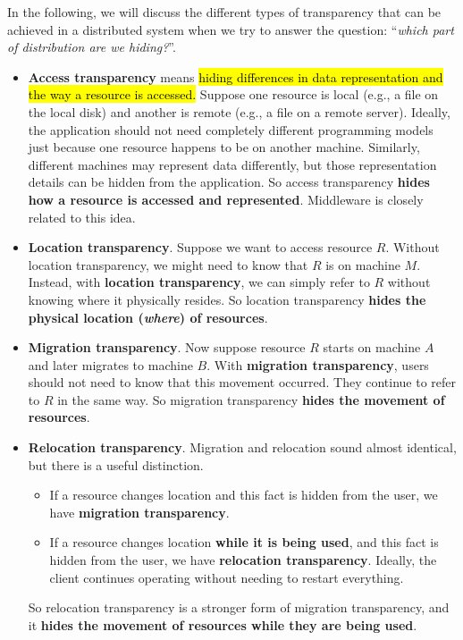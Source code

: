 \noindent
In the following, we will discuss the different types of transparency that can be achieved in a distributed system when we try to answer the question: ``\emph{which part of distribution are we hiding?}''.
\begin{itemize}\label{item:location-transparency}
    \item[\textcolor{Green3}{\faIcon{plug}}] \textcolor{Green3}{\textbf{Access transparency}} means \hl{hiding differences in data representation and the way a resource is accessed.} Suppose one resource is local (e.g., a file on the local disk) and another is remote (e.g., a file on a remote server). Ideally, the application should not need completely different programming models just because one resource happens to be on another machine. Similarly, different machines may represent data differently, but those representation details can be hidden from the application. So access transparency \textbf{hides how a resource is accessed and represented}. Middleware is closely related to this idea.

    \item[\textcolor{Green3}{\faIcon{map-marker-alt}}] \textcolor{Green3}{\textbf{Location transparency}}. Suppose we want to access resource $R$. Without location transparency, we might need to know that $R$ is on machine $M$. Instead, with \textbf{location transparency}, we can simply refer to $R$ without knowing where it physically resides. So location transparency \textbf{hides the physical location (\emph{where}) of resources}.

    \item[\textcolor{Green3}{\faIcon{exchange-alt}}] \textcolor{Green3}{\textbf{Migration transparency}}. Now suppose resource $R$ starts on machine $A$ and later migrates to machine $B$. With \textbf{migration transparency}, users should not need to know that this movement occurred. They continue to refer to $R$ in the same way. So migration transparency \textbf{hides the movement of resources}.

    \item[\textcolor{Green3}{\faIcon{route}}] \textcolor{Green3}{\textbf{Relocation transparency}}. Migration and relocation sound almost identical, but there is a useful distinction.
        \begin{itemize}
            \item If a resource changes location and this fact is hidden from the user, we have \textbf{migration transparency}.
            \item If a resource changes location \textbf{while it is being used}, and this fact is hidden from the user, we have \textbf{relocation transparency}. Ideally, the client continues operating without needing to restart everything.
        \end{itemize}
        So relocation transparency is a stronger form of migration transparency, and it \textbf{hides the movement of resources while they are being used}.


\end{itemize}
